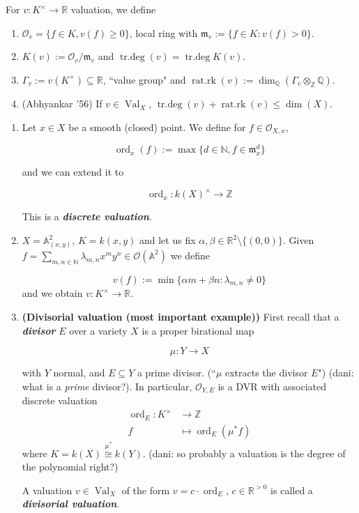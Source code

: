 \medskip{}
For $v: K^\times \longrightarrow \mathbb{R}$
valuation, we define
\begin{enumerate}
\item $\mathcal{O}_v=\{f \in K, v(f) \geq
0\}$, local ring with $\mathfrak{m}_v:=\{f
\in K: v(f)>0\}$.
\item $K(v):= \mathcal{O}_v/\mathfrak{m}_v$
and
$\operatorname{tr.deg}(v)=
\operatorname{tr.deg}K(v)$.
\item $\Gamma_v:=v(K^\times) \subseteq
\mathbb{R}$, ``value group" and
$\operatorname{rat.rk}(v):=\dim_\mathbb{Q}(
\Gamma_v
\otimes_{\mathbb{Z}}\mathbb{Q})$.
\item (Abhyankar '56) If $v \in
\operatorname{Val}_X$,
$\operatorname{tr.deg}(v)+
\operatorname{rat.rk}(v)\leq
\dim(X)$.
\end{enumerate}

\begin{example}
\label{example-montero-1}
\begin{enumerate}
\item Let $x \in X$ be a smooth (closed)
point. We define for $f \in
\mathcal{O}_{X,x}$,

$$
\operatorname{ord}_x(f):=
\operatorname{max}\{ d \in \mathbb{N}, f \in
\mathfrak{m}^d_x\}
$$

and we can extend it to

$$
\operatorname{ord}_x:k(X)^\times
\longrightarrow \mathbb{Z}
$$

This is a \textit{\textbf{discrete
valuation}}.

\item $X=\mathbb{A}^2_{(x,y)}$, $K=k(x,y)$
and let us fix  $\alpha,\beta \in
\mathbb{R}^2\setminus \{(0,0)\}$. Given $f =
\sum_{m,n \in \mathbb{N}}\lambda_{m,n}x^my^n
\in \mathcal{O}(\mathbb{A}^2)$ we define

$$
v(f):=\operatorname{min}\{ \alpha m + \beta
n: \lambda_{m,n}\neq  0\}
$$
and we obtain $v:K^\times \to \mathbb{R}$.

\item \textbf{(Divisorial valuation (most
important example))} First recall that a
\textit{\textbf{divisor}} $E$ over a variety
$X$ is a proper birational map

$$
\mu:Y \longrightarrow X
$$

with $Y$ normal, and $E \subseteq Y$ a prime
divisor. (``$\mu$ extracts the divisor $E$")
{(dani: what is a \textit{prime} divisor?)}.
In particular, $\mathcal{O}_{Y,E}$ is a DVR
with associated discrete valuation
$$
\begin{aligned}
\operatorname{ord}_E: K^\times
&\longrightarrow \mathbb{Z} \\
f &\longmapsto \operatorname{ord}_E(\mu^*f)
\end{aligned}
$$
where $K=k(X) \overset{\mu^*}{\cong}k(Y)$.
{(dani: so probably a valuation is the degree
of the polynomial right?)}

A valuation $v \in \operatorname{Val}_X$ of
the form $v = c \cdot \operatorname{ord}_E$,
$c \in \mathbb{R}^{>0}$ is called a
\textit{\textbf{divisorial valuation}}.

\end{enumerate}
\end{example}

